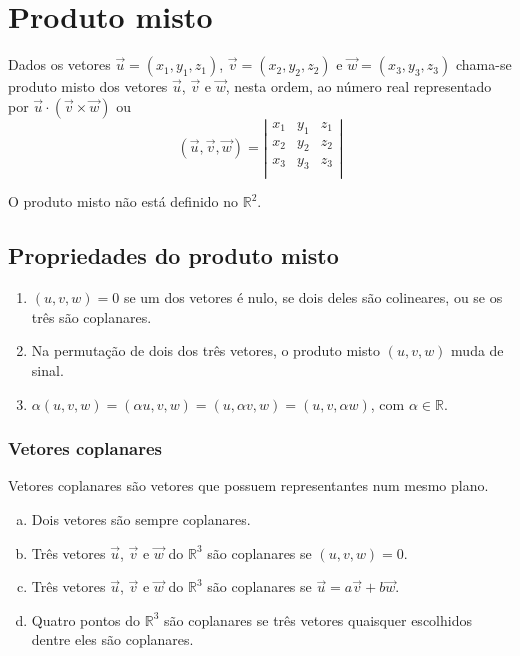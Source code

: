 \chapter{Produto misto}

\begin{df} Dados os vetores $\vec{u}=(x_1, y_1, z_1)$, $\vec{v}=(x_2, y_2, z_2)$ e $\vec{w}=(x_3, y_3, z_3)$ chama-se produto misto dos vetores $\vec{u}$, $\vec{v}$ e $\vec w$, nesta ordem, ao número real representado por $\vec{u}\cdot (\vec{v}\times \vec w)$ ou $$(\vec{u}, \vec{v}, \vec w)= \left|
\begin{array}{ccc}
x_1 & y_1 & z_1 \\
x_2 & y_2 & z_2 \\
x_3 & y_3 & z_3 \\
\end{array}
\right|$$

O produto misto não está definido no $\mathbb{R}^2$.
\end{df} 

\section{Propriedades do produto misto}

\begin{enumerate}[(1)]
 \item $(u,v,w)=0$ se um dos vetores é nulo, se dois deles são colineares, ou se os três são coplanares.
 \item Na permutação de dois dos três vetores, o produto misto $(u,v,w)$  muda de sinal.
 \item $\alpha(u,v,w)= (\alpha u,v,w)=(u,\alpha v,w)=(u,v,\alpha w)$, com $\alpha \in \mathbb{R}$.
\end{enumerate}

\subsection{Vetores coplanares}

Vetores coplanares são vetores que possuem representantes num mesmo plano.
\begin{enumerate}[a)]
 \item Dois vetores são sempre coplanares.
 \item Três vetores $\vec u$, $\vec v$ e $\vec w$ do $\mathbb{R}^3$ são coplanares se $(u,v,w)=0$.
 \item Três vetores $\vec u$, $\vec v$ e $\vec w$ do $\mathbb{R}^3$ são coplanares se $\vec u=a\vec v + b\vec w$.
 \item Quatro pontos do $\mathbb{R}^3$ são coplanares se três vetores quaisquer escolhidos dentre eles são coplanares.
\end{enumerate}

